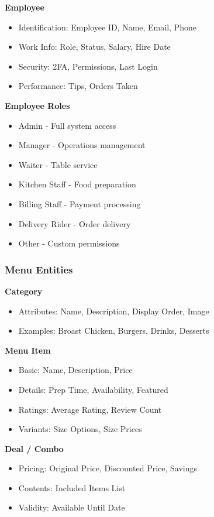 \documentclass[12pt,a4paper]{article}
\begin{document}
\textbf{Employee}
\begin{itemize}
    \item Identification: Employee ID, Name, Email, Phone
    \item Work Info: Role, Status, Salary, Hire Date
    \item Security: 2FA, Permissions, Last Login
    \item Performance: Tips, Orders Taken
\end{itemize}

\textbf{Employee Roles}
\begin{itemize}
    \item Admin - Full system access
    \item Manager - Operations management
    \item Waiter - Table service
    \item Kitchen Staff - Food preparation
    \item Billing Staff - Payment processing
    \item Delivery Rider - Order delivery
    \item Other - Custom permissions
\end{itemize}

\subsubsection{Menu Entities}

\textbf{Category}
\begin{itemize}
    \item Attributes: Name, Description, Display Order, Image
    \item Examples: Broast Chicken, Burgers, Drinks, Desserts
\end{itemize}

\textbf{Menu Item}
\begin{itemize}
    \item Basic: Name, Description, Price
    \item Details: Prep Time, Availability, Featured
    \item Ratings: Average Rating, Review Count
    \item Variants: Size Options, Size Prices
\end{itemize}

\textbf{Deal / Combo}
\begin{itemize}
    \item Pricing: Original Price, Discounted Price, Savings
    \item Contents: Included Items List
    \item Validity: Available Until Date
\end{itemize}
\end{document}
